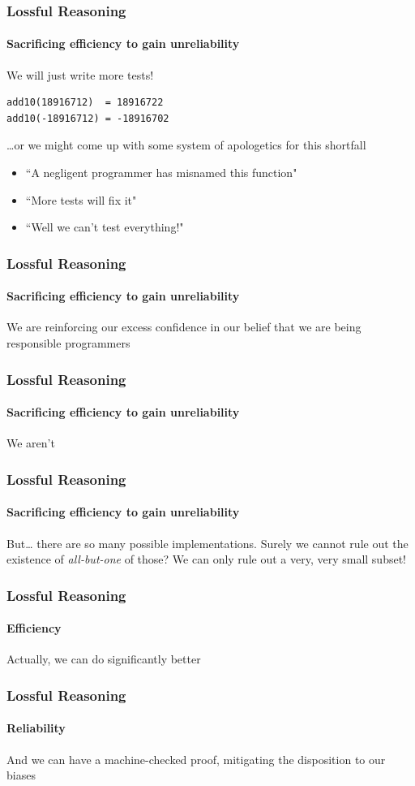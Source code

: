 \begin{frame}[fragile]
\frametitle{Lossful Reasoning}
\framesubtitle{Sacrificing efficiency to gain unreliability}
We will just write more tests!
\begin{lstlisting}[style=scala]
add10(18916712)  = 18916722
add10(-18916712) = -18916702
\end{lstlisting}
\ldots or we might come up with some system of apologetics for this shortfall
\begin{itemize}
  \item ``A negligent programmer has misnamed this function"
  \item ``More tests will fix it"
  \item ``Well we can't test everything!"
\end{itemize}
\end{frame}

\begin{frame}[fragile]
\frametitle{Lossful Reasoning}
\framesubtitle{Sacrificing efficiency to gain unreliability}
\begin{center}{We are reinforcing our excess confidence in our belief that we
are being responsible programmers}
\end{center}
\end{frame}

\begin{frame}[fragile]
\frametitle{Lossful Reasoning}
\framesubtitle{Sacrificing efficiency to gain unreliability}
\begin{center}
We aren't
\end{center}
\end{frame}

\begin{frame}[fragile]
\frametitle{Lossful Reasoning}
\framesubtitle{Sacrificing efficiency to gain unreliability}
\begin{block}{But\ldots}
there are so many possible implementations. Surely we cannot 
rule out the existence of \emph{all-but-one} of those? We can only rule out a
\scriptsize{very, very} \tiny{small subset}!
\end{block}
\end{frame}

\begin{frame}[fragile]
\frametitle{Lossful Reasoning}
\framesubtitle{Efficiency}
\begin{center}
Actually, we can do significantly better
\end{center}
\end{frame}

\begin{frame}[fragile]
\frametitle{Lossful Reasoning}
\framesubtitle{Reliability}
\begin{center}
And we can have a machine-checked proof, mitigating the disposition to
our biases
\end{center}
\end{frame}
